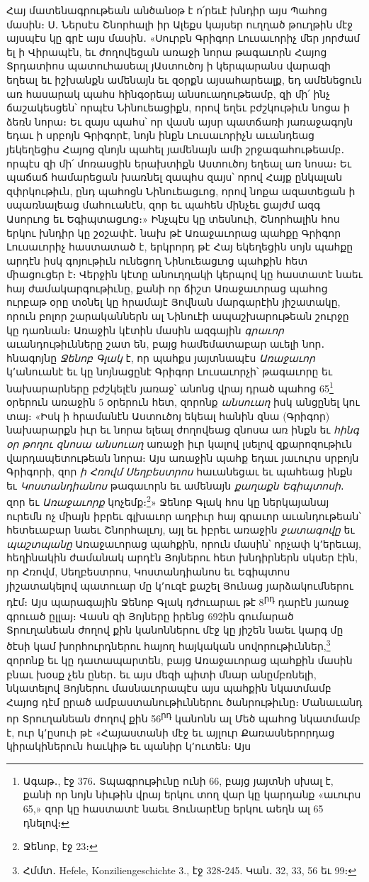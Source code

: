 \documentclass{article}
\begin{document}
{Հայ մատենագրութեան անծանօթ է ո՛րեւէ խնդիր այս Պահոց մասին։ Ս․ Ներսէս Շնորհալի իր Ալեքս կայսեր ուղղած թուղթին մէջ այսպէս կը գրէ այս մասին․ «Սուրբն Գրիգոր Լուսաւորիչ մեր յորժամ ել ի Վիրապէն, եւ ժողովեցան առաջի նորա թագաւորն Հայոց Տրդատիոս պատուհասեալ յԱստուծոյ ի կերպարանս վարազի եղեալ եւ իշխանքն ամենայն եւ զօրքն այսահարեալք, եդ ամենեցուն առ հասարակ պահս հինգօրեայ անսուաղութեամբ, զի մի՛ ինչ ճաշակեսցեն՝ որպէս Նինուեացիքն, որով եղեւ բժշկութիւն նոցա ի ձեռն նորա։ Եւ զայս պահս՝ որ վասն այսր պատճառի յառաջագոյն եդաւ ի սրբոյն Գրիգորէ, նոյն ինքն Լուսաւորիչն աւանդեաց յեկեղեցիս Հայոց զնոյն պահել յամենայն ամի շրջագահութեամբ․ որպէս զի մի՛ մոռասցին երախտիքն Աստուծոյ եղեալ առ նոսա։ Եւ պաճաճ համարեցան խառնել զապհս զայս՝ որով Հայք ընկալան զփրկութիւն, ընդ պահոցն Նինուեացւոց, որով նոքա ազատեցան ի սպառնալեաց մահուանէն, զոր եւ պահեն մինչեւ ցայժմ ազգ Ասորւոց եւ Եգիպտացւոց։» Ինչպէս կը տեսնուի, Շնորհալին հոս երկու խնդիր կը շօշափէ․ նախ թէ Առաջաւորաց պահքը Գրիգոր Լուսաւորիչ հաստատած է, երկրորդ թէ Հայ եկեղեցին սոյն պահքը արդէն իսկ գոյութիւն ունեցող Նինուեացւոց պահքին հետ միացուցեր է։ Վերջին կէտը անուղղակի կերպով կը հաստատէ նաեւ հայ ժամակարգութիւնը, քանի որ ճիշտ Առաջաւորաց պահոց ուրբաթ օրը տօնել կը հրամայէ Յովնան մարգարէին յիշատակը, որուն բոլոր շարականներն ալ Նինուէի ապաշխարութեան շուրջը կը դառնան։ Առաջին կէտին մասին ազգային \emph{գրաւոր} աւանդութիւնները շատ են, բայց համեմատաբար աւելի նոր․ հնագոյնը \emph{Ջենոբ Գլակ} է, որ պահքս յայտնապէս \emph{Առաջաւոր} կ՚անուանէ եւ կը նոյնացընէ Գրիգոր Լուսաւորչի՝ թագաւորը եւ նախարարները բժշկելէն յառաջ՝ անոնց վրայ դրած պահոց 65\footnote{Ագաթ․, էջ 376․ Տպագրութիւնը ունի 66, բայց յայտնի սխալ է, քանի որ նոյն նիւթին վրայ երկու տող վար կը կարդանք «աւուրս 65,» զոր կը հաստատէ նաեւ Յունարէնը երկու աեղն ալ 65 դնելով։} օրերուն առաջին 5 օրերուն հետ, զորոնք \emph{անսուաղ} իսկ անցընել կու տայ։ «Իսկ ի հրամանէն Աստուծոյ եկեալ հանին զնա (Գրիգոր) նախարարքն իւր եւ նորա ելեալ ժողովեաց զնոսա առ ինքն եւ \emph{հինգ օր թողու զնոսա անսուաղ} առաջի իւր կալով լսելով զքարոզութիւն վարդապետութեան նորա։ Այս առաջին պահք եդաւ յաւուրս սրբոյն Գրիգորի, զոր \emph{ի Հռովմ Սեղբեստրոս} հաւանեցաւ եւ պահեաց ինքն եւ \emph{Կոստանդիանոս} թագաւորն եւ ամենայն \emph{քաղաքն Եգիպտոսի}․ զոր եւ \emph{Առաջաւորք} կոչեմք։\footnote{Ջենոբ, էջ 23։}» Ջենոբ Գլակ հոս կը ներկայանայ ուրեմն ոչ միայն իբրեւ գլխաւոր աղբիւր հայ գրաւոր աւանդութեան՝ հետեւաբար նաեւ Շնորհալւոյ, այլ եւ իբրեւ առաջին \emph{ջատագովը} եւ \emph{պաշտպանը} Առաջաւորաց պահքին, որուն մասին՝ որչափ կ՚երեւայ, հեղինակին ժամանակ արդէն Յոյներու հետ խնդիրներն սկսեր էին, որ Հռովմ, Սեղբեստրոս, Կոստանդիանոս եւ Եգիպտոս յիշատակելով պատուար մը կ՚ուզէ քաշել Յունաց յարձակումներու դէմ։ Այս պարագային Ջենոբ Գլակ դժուարաւ թէ 8\textsuperscript{րդ} դարէն յառաջ գրուած ըլլայ։ Վասն զի Յոյները իրենց 692ին գումարած Տրուղանեան ժողով քին կանոններու մէջ կը յիշեն նաեւ կարգ մը ծէսի կամ խորհուրդներու հայող հայկական սովորութիւններ,\footnote{Հմմտ․ Hefele, Konziliengeschichte 3., էջ 328֊245. Կան․ 32, 33, 56 եւ 99։} զորոնք եւ կը դատապարտեն, բայց Առաջաւորաց պահքին մասին բնաւ խօսք չեն ըներ․ եւ այս մեզի պիտի մնար անըմբռնելի, նկատելով Յոյներու մասնաւորապէս այս պահքին նկատմամբ Հայոց դէմ ըրած ամբաստանութիւններու ծանրութիւնը։ Մանաւանդ որ Տրուղանեան ժողով քին 56\textsuperscript{րդ} կանոնն ալ Մեծ պահոց նկատմամբ է, ուր կ՚ըսուի թէ «Հայաստանի մէջ եւ այլուր Քառասներորդաց կիրակիներուն հաւկիթ եւ պանիր կ՚ուտեն։ Այս }
\end{document}
